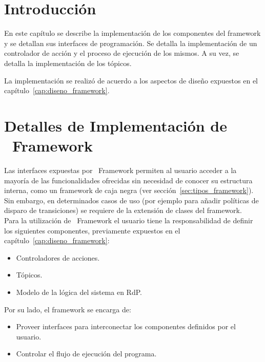 \section{Introducción}
En este capítulo se describe la implementación de los componentes del framework
y se detallan sus interfaces de programación.
Se detalla la implementación de un controlador de acción y el
proceso de ejecución de los mismos. A su vez, se detalla la implementación de
los tópicos.

La implementación se realizó de acuerdo a los aspectos de diseño
expuestos en el capítulo~\ref{cap:diseno_framework}.

\section{Detalles de Implementación de \nombreFramework \ Framework}

Las interfaces expuestas por \nombreFramework\ Framework permiten al usuario
acceder a la mayoría de las funcionalidades ofrecidas sin necesidad de conocer
su estructura interna, como un framework de caja negra (ver sección~\ref{sec:tipos_framework}).
Sin embargo, en determinados casos de uso (por ejemplo para añadir políticas
de disparo de transiciones) se requiere de la extensión de clases del framework.
\\
Para la utilización de \nombreFramework\ Framework el usuario tiene la
responsabilidad de definir los siguientes componentes, previamente expuestos en
el capítulo~\ref{cap:diseno_framework}:
\begin{itemize} 
  \item Controladores de acciones.
  \item Tópicos.
  \item Modelo de la lógica del sistema en RdP.
\end{itemize}

Por su lado, el framework se encarga de:
\begin{itemize} 
  \item Proveer interfaces para interconectar los componentes definidos por el
  usuario.
  \item Controlar el flujo de ejecución del programa.
\end{itemize}


